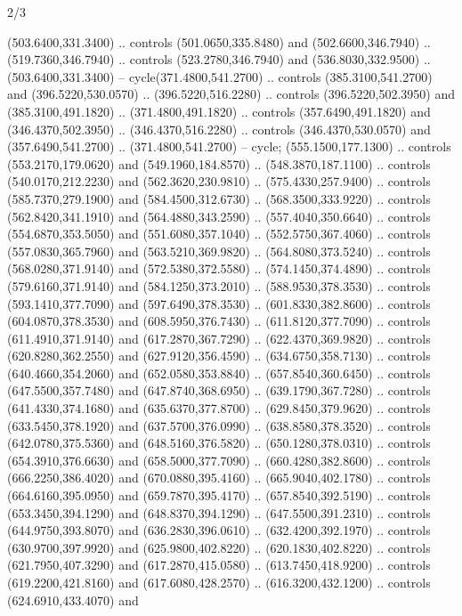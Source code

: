 \begin{flagdescription}{2/3}
\begin{scope}[xshift=0.5\flaglength,yshift=0.5\flagwidth,scale=\flagwidth/255]
\begin{scope}[y=-0.43pt, x=0.43pt,xshift=-193pt,yshift=133pt]
\begin{scope}[draw=black,line width=0.003\flagwidth]
\begin{scope}[fill=white]
 (503.6400,331.3400) .. controls (501.0650,335.8480) and
  (502.6600,346.7940) .. (519.7360,346.7940) .. controls (523.2780,346.7940) and
  (536.8030,332.9500) .. (503.6400,331.3400) -- cycle(371.4800,541.2700) ..
  controls (385.3100,541.2700) and (396.5220,530.0570) .. (396.5220,516.2280) ..
  controls (396.5220,502.3950) and (385.3100,491.1820) .. (371.4800,491.1820) ..
  controls (357.6490,491.1820) and (346.4370,502.3950) .. (346.4370,516.2280) ..
  controls (346.4370,530.0570) and (357.6490,541.2700) .. (371.4800,541.2700) --
  cycle;
 (555.1500,177.1300) .. controls (553.2170,179.0620) and
  (549.1960,184.8570) .. (548.3870,187.1100) .. controls (540.0170,212.2230) and
  (562.3620,230.9810) .. (575.4330,257.9400) .. controls (585.7370,279.1900) and
  (584.4500,312.6730) .. (568.3500,333.9220) .. controls (562.8420,341.1910) and
  (564.4880,343.2590) .. (557.4040,350.6640) .. controls (554.6870,353.5050) and
  (551.6080,357.1040) .. (552.5750,367.4060) .. controls (557.0830,365.7960) and
  (563.5210,369.9820) .. (564.8080,373.5240) .. controls (568.0280,371.9140) and
  (572.5380,372.5580) .. (574.1450,374.4890) .. controls (579.6160,371.9140) and
  (584.1250,373.2010) .. (588.9530,378.3530) .. controls (593.1410,377.7090) and
  (597.6490,378.3530) .. (601.8330,382.8600) .. controls (604.0870,378.3530) and
  (608.5950,376.7430) .. (611.8120,377.7090) .. controls (611.4910,371.9140) and
  (617.2870,367.7290) .. (622.4370,369.9820) .. controls (620.8280,362.2550) and
  (627.9120,356.4590) .. (634.6750,358.7130) .. controls (640.4660,354.2060) and
  (652.0580,353.8840) .. (657.8540,360.6450) .. controls (647.5500,357.7480) and
  (647.8740,368.6950) .. (639.1790,367.7280) .. controls (641.4330,374.1680) and
  (635.6370,377.8700) .. (629.8450,379.9620) .. controls (633.5450,378.1920) and
  (637.5700,376.0990) .. (638.8580,378.3520) .. controls (642.0780,375.5360) and
  (648.5160,376.5820) .. (650.1280,378.0310) .. controls (654.3910,376.6630) and
  (658.5000,377.7090) .. (660.4280,382.8600) .. controls (666.2250,386.4020) and
  (670.0880,395.4160) .. (665.9040,402.1780) .. controls (664.6160,395.0950) and
  (659.7870,395.4170) .. (657.8540,392.5190) .. controls (653.3450,394.1290) and
  (648.8370,394.1290) .. (647.5500,391.2310) .. controls (644.9750,393.8070) and
  (636.2830,396.0610) .. (632.4200,392.1970) .. controls (630.9700,397.9920) and
  (625.9800,402.8220) .. (620.1830,402.8220) .. controls (621.7950,407.3290) and
  (617.2870,415.0580) .. (613.7450,418.9200) .. controls (619.2200,421.8160) and
  (617.6080,428.2570) .. (616.3200,432.1200) .. controls (624.6910,433.4070) and

\end{scope}
\end{scope}
\end{scope}
\end{scope}
\end{flagdescription}
